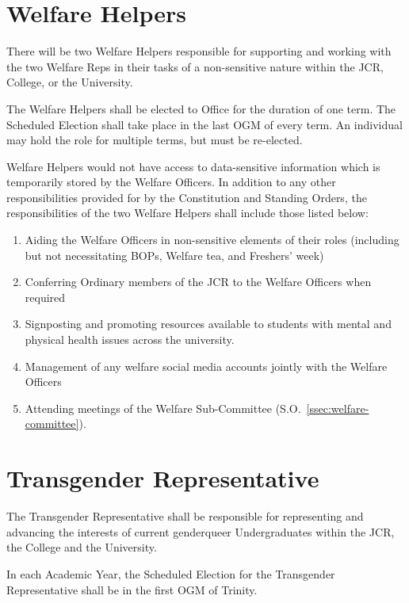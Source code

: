 \section{Welfare Helpers}
\npara There will be two Welfare Helpers responsible for supporting and working with the two Welfare Reps in their tasks of a non-sensitive nature within the JCR, College, or the University.

\npara The Welfare Helpers shall be elected to Office for the duration of one term. The Scheduled Election shall take place in the last OGM of every term. An individual may hold the role for multiple terms, but must be re-elected.

\npara Welfare Helpers would not have access to data-sensitive information which is temporarily stored by the Welfare Officers.
\npara In addition to any other responsibilities provided for by the Constitution and Standing Orders, the responsibilities of the two Welfare Helpers shall include those listed below: 
\begin{enumerate}
    \item Aiding the Welfare Officers in non-sensitive elements of their roles (including but not necessitating BOPs, Welfare tea, and Freshers’ week) 
    \item Conferring Ordinary members of the JCR to the Welfare Officers when required
    \item Signposting and promoting resources available to students with mental and physical health issues across the university.
    \item Management of any welfare social media accounts jointly with the Welfare Officers
    \item Attending meetings of the Welfare Sub-Committee (S.O.~\ref{ssec:welfare-committee}).
\end{enumerate}

\section{Transgender Representative}
\npara The Transgender Representative shall be responsible for representing and advancing the interests of current genderqueer Undergraduates within the JCR, the College and the University.

\npara In each Academic Year, the Scheduled Election for the Transgender Representative shall be in the first OGM of Trinity.

